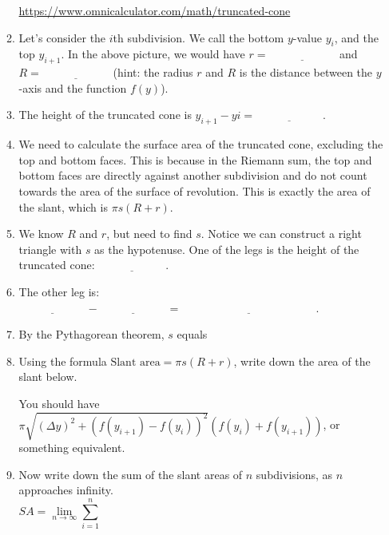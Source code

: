 \documentclass{article}
\begin{document}
\begin{itemize}[topsep=0pt]
\begin{enumerate}
\begin{center}
			\url{https://www.omnicalculator.com/math/truncated-cone}
		\end{center}

	\item Let's consider the $i$th subdivision. We call the bottom $y$-value $y_i$, and the top $y_{i+1}$. In the above picture, we would have $r=\underline{\hspace{1in}}$ and $R=\underline{\hspace{1in}}$ (hint: the radius $r$ and $R$ is the distance between the $y$-axis and the function $f(y)$).

	\item The height of the truncated cone is $y_{i+1}-y{i}=\underline{\hspace{1in}}$.

	\item We need to calculate the surface area of the truncated cone, excluding the top and bottom faces. This is because in the Riemann sum, the top and bottom faces are directly against another subdivision and do not count towards the area of the surface of revolution. This is exactly the area of the slant, which is $\pi s(R+r)$.

	\item We know $R$ and $r$, but need to find $s$. Notice we can construct a right triangle with $s$ as the hypotenuse. One of the legs is the height of the truncated cone: $\underline{\hspace{1in}}$.

	\item The other leg is: $\underline{\hspace{1in}}-\underline{\hspace{1in}}=\underline{\hspace{2in}}$.

	\vspace{0.25in}
	\item By the Pythagorean theorem, $s$ equals \hrulefill

	\item Using the formula $\text{Slant area}=\pi s(R+r)$, write down the area of the slant below.
		\vspace{0.8in}
		\begin{mdframed}
			You should have $\displaystyle \pi \sqrt{\left( \Delta y \right)^2+\left( f(y_{i+1})-f(y_i) \right)^2}\left( f(y_i)+f(y_{i+1}) \right)$, or something equivalent.
		\end{mdframed}

	\item Now write down the sum of the slant areas of $n$ subdivisions, as $n$ approaches infinity.
		\vspace{-0.2in}
		\begin{equation*}
			SA
			=\lim_{n\to\infty}\sum_{i=1}^{n}\hspace{5in}
		\end{equation*}


\end{enumerate}
\end{itemize}
\end{document}
